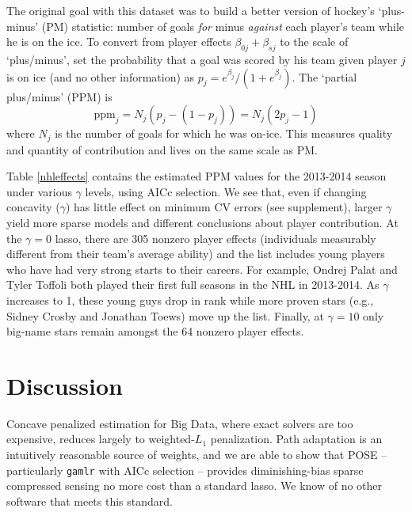 \documentclass[12pt]{article}
\newcommand{\mr}[1]{\mathrm{#1}}
\begin{document}
The original goal with this dataset was to build a better version of
hockey's `plus-minus' (PM) statistic: number of goals {\it for} minus {\it
against} each player's team while he is on the ice. To convert from player
effects $\beta_{0j} + \beta_{sj}$ to the scale of `plus/minus', set the probability that a goal was scored by his team given player
$j$ is on ice  (and no other information) as $p_j = e^{\beta_j}/(1+e^{\beta_j})$. The `partial
plus/minus' (PPM) is 
\begin{equation}
 \mr{ppm}_j = N_j(p_j - (1-p_j)) = N_j(2p_j-1)
 \end{equation}  where
$N_j$ is the  number of goals for which he was on-ice.  This measures 
quality and quantity of contribution and lives on the same scale as PM.

Table \ref{nhleffects} contains the estimated PPM values for the 2013-2014
season under various $\gamma$ levels, using AICc selection.  We see that, even
if changing concavity ($\gamma$) has little effect on minimum CV errors (see supplement),
larger $\gamma$  yield more sparse models and different conclusions about
player contribution. At the $\gamma=0$ lasso, there are 305 nonzero player
effects (individuals measurably different from their team's average ability)
and the list includes young players who have had very strong starts to their
careers.  For example, Ondrej Palat and Tyler Toffoli both played their first
full seasons in the NHL in 2013-2014.  As $\gamma$ increases to 1, these young
guys  drop in rank while more proven stars (e.g., Sidney Crosby and Jonathan
Toews) move up the list.  Finally, at $\gamma=10$ only big-name stars remain
amongst the 64 nonzero player effects.


\section{Discussion}
\label{discussion}


Concave penalized estimation for Big Data, where exact solvers are too
 expensive, reduces largely to weighted-$L_1$ penalization.
Path adaptation is an intuitively reasonable source of weights, and we are able to show that POSE -- particularly {\tt gamlr} with AICc selection -- provides diminishing-bias sparse compressed sensing
no more cost than a  standard lasso.  We know of no other software that meets this standard.





\end{document}
